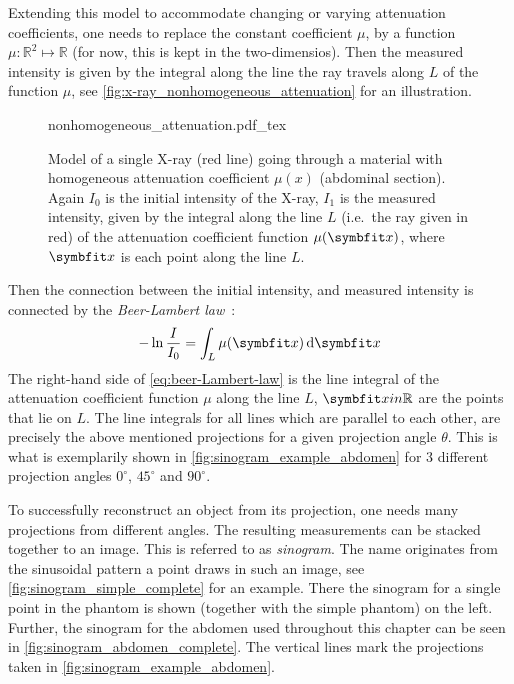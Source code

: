Extending this model to accommodate changing or varying attenuation coefficients, one needs to
replace the constant coefficient \(\mu\), by a function \(\mu: \mathbb{R}^2 \mapsto \mathbb{R}\)
(for now, this is kept in the two-dimensios). Then the measured intensity is given by the
integral along the line the ray travels along \(L\) of the function \(\mu\), see
\autoref{fig:x-ray_nonhomogeneous_attenuation} for an illustration.

\begin{figure}
	\centering
	\def\svgwidth{0.75\textwidth}
	{nonhomogeneous_attenuation.pdf_tex}
	\caption{Model of a single X-ray (red line) going through a material with
		homogeneous attenuation coefficient \(\mu(x)\) (abdominal section). Again \(I_0\) is
		the initial intensity of the X-ray, \(I_1\) is the measured intensity, given by the
		integral along the line \(L\) (i.e.\ the ray given in red) of the attenuation
		coefficient function \(\mu(\mvec{x})\), where \(\mvec{x}\) is each point along the
		line \(L\).}\label{fig:x-ray_nonhomogeneous_attenuation}
\end{figure}

Then the connection between the initial intensity, and measured intensity is connected by the
\textit{Beer-Lambert law}~\cite{buzug_computed_2008}:
\begin{equation}\label{eq:beer-Lambert-law}
	- \ln \frac{I}{I_0} = \int_L \mu (\mvec{x}) \, \mathrm{d}\mvec{x}
\end{equation}
The right-hand side of \autoref{eq:beer-Lambert-law} is the line integral of the attenuation
coefficient function \(\mu\) along the line \(L\), \(\mvec{x} in \mathbb{R}\) are the points that
lie on \(L\). The line integrals for all lines which are parallel to each other, are precisely the
above mentioned projections for a given projection angle \(\theta\). This is what is exemplarily
shown in \autoref{fig:sinogram_example_abdomen} for 3 different projection angles \(0^\circ\),
\(45^\circ\) and \(90^\circ\).

To successfully reconstruct an object from its projection, one needs many projections from different
angles. The resulting measurements can be stacked together to an image. This is referred to as
\textit{sinogram}. The name originates from the sinusoidal pattern a point draws in such an image,
see \autoref{fig:sinogram_simple_complete} for an example. There the sinogram for a single point in
the phantom is shown (together with the simple phantom) on the left. Further, the sinogram for the
abdomen used throughout this chapter can be seen in \autoref{fig:sinogram_abdomen_complete}. The
vertical lines mark the projections taken in \autoref{fig:sinogram_example_abdomen}.


